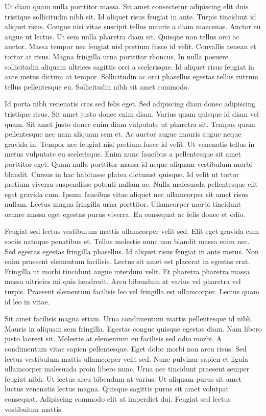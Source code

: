 \documentclass[11pt,a4paper]{article}
\begin{document}
Ut diam quam nulla porttitor massa. Sit amet consectetur adipiscing elit duis tristique sollicitudin nibh sit. Id aliquet risus feugiat in ante. Turpis tincidunt id aliquet risus. Congue nisi vitae suscipit tellus mauris a diam maecenas. Auctor eu augue ut lectus. Ut sem nulla pharetra diam sit. Quisque non tellus orci ac auctor. Massa tempor nec feugiat nisl pretium fusce id velit. Convallis aenean et tortor at risus. Magna fringilla urna porttitor rhoncus. In nulla posuere sollicitudin aliquam ultrices sagittis orci a scelerisque. Id aliquet risus feugiat in ante metus dictum at tempor. Sollicitudin ac orci phasellus egestas tellus rutrum tellus pellentesque eu. Sollicitudin nibh sit amet commodo.

Id porta nibh venenatis cras sed felis eget. Sed adipiscing diam donec adipiscing tristique risus. Sit amet justo donec enim diam. Varius quam quisque id diam vel quam. Sit amet justo donec enim diam vulputate ut pharetra sit. Tempus quam pellentesque nec nam aliquam sem et. Ac auctor augue mauris augue neque gravida in. Tempor nec feugiat nisl pretium fusce id velit. Ut venenatis tellus in metus vulputate eu scelerisque. Enim nunc faucibus a pellentesque sit amet porttitor eget. Quam nulla porttitor massa id neque aliquam vestibulum morbi blandit. Cursus in hac habitasse platea dictumst quisque. Id velit ut tortor pretium viverra suspendisse potenti nullam ac. Nulla malesuada pellentesque elit eget gravida cum. Ipsum faucibus vitae aliquet nec ullamcorper sit amet risus nullam. Lectus magna fringilla urna porttitor. Ullamcorper morbi tincidunt ornare massa eget egestas purus viverra. Eu consequat ac felis donec et odio.

Feugiat sed lectus vestibulum mattis ullamcorper velit sed. Elit eget gravida cum sociis natoque penatibus et. Tellus molestie nunc non blandit massa enim nec. Sed egestas egestas fringilla phasellus. Id aliquet risus feugiat in ante metus. Non enim praesent elementum facilisis. Lectus sit amet est placerat in egestas erat. Fringilla ut morbi tincidunt augue interdum velit. Et pharetra pharetra massa massa ultricies mi quis hendrerit. Arcu bibendum at varius vel pharetra vel turpis. Praesent elementum facilisis leo vel fringilla est ullamcorper. Lectus quam id leo in vitae.

Sit amet facilisis magna etiam. Urna condimentum mattis pellentesque id nibh. Mauris in aliquam sem fringilla. Egestas congue quisque egestas diam. Nam libero justo laoreet sit. Molestie at elementum eu facilisis sed odio morbi. A condimentum vitae sapien pellentesque. Eget dolor morbi non arcu risus. Sed lectus vestibulum mattis ullamcorper velit sed. Nunc pulvinar sapien et ligula ullamcorper malesuada proin libero nunc. Urna nec tincidunt praesent semper feugiat nibh. Ut lectus arcu bibendum at varius. Ut aliquam purus sit amet luctus venenatis lectus magna. Quisque sagittis purus sit amet volutpat consequat. Adipiscing commodo elit at imperdiet dui. Feugiat sed lectus vestibulum mattis.
\end{document}
